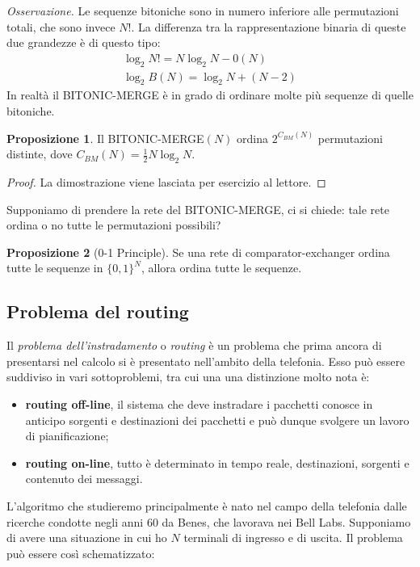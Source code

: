 \documentclass[a4paper,portrait,12pt]{article}
\theoremstyle{definition}
\newtheorem{proposition}{Proposizione}
\begin{document}
\textit{Osservazione.} Le sequenze bitoniche sono in numero inferiore alle permutazioni totali, che sono invece
$N!$.
La differenza tra la rappresentazione binaria di queste due grandezze è di questo tipo:
\begin{gather*}
\log_2 N! = N \log_2 N - 0(N)\\
\log_2 B(N) = \log_2 N + (N - 2)
\end{gather*}
In realtà il BITONIC-MERGE è in grado di ordinare molte più sequenze di quelle bitoniche.

\begin{proposition}
Il BITONIC-MERGE$(N)$ ordina $2^{C_{BM}(N)}$ permutazioni distinte, dove $C_{BM} (N) = \frac{1}{2} N \log_2 N$.
\end{proposition}
\begin{proof}
La dimostrazione viene lasciata per esercizio al lettore.
\end{proof}

Supponiamo di prendere la rete del BITONIC-MERGE, ci si chiede: tale rete ordina o no tutte le permutazioni possibili?

\begin{proposition}[0-1 Principle]
Se una rete di comparator-exchanger ordina tutte le sequenze in $\{0,1\}^N$, allora ordina tutte le sequenze.
\end{proposition}


\subsection{Problema del routing}

Il \textit{problema dell’instradamento} o \textit{routing} è un problema che prima ancora di presentarsi nel calcolo si è presentato nell’ambito della telefonia.
Esso può essere suddiviso in vari sottoproblemi, tra cui una una distinzione molto nota è:

\begin{itemize}
\item \textbf{routing off-line}, il sistema che deve instradare i pacchetti conosce in anticipo sorgenti e destinazioni dei pacchetti e può dunque svolgere un lavoro di pianificazione;
\item \textbf{routing on-line}, tutto è determinato in tempo reale, destinazioni, sorgenti e contenuto dei messaggi.
\end{itemize}

L’algoritmo che studieremo principalmente è nato nel campo della telefonia dalle ricerche condotte negli anni 60 da Benes, che lavorava nei Bell Labs.
Supponiamo di avere una situazione in cui ho $N$ terminali di ingresso e di uscita.
Il problema può essere così schematizzato:\\
\end{document}
